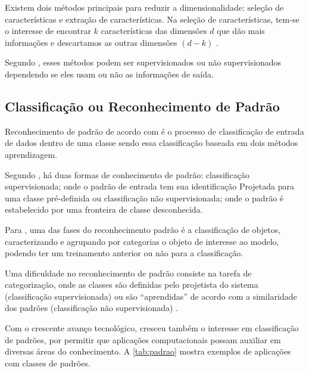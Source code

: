Existem dois métodos principais para reduzir a dimensionalidade: seleção de características e extração de características. Na seleção de características, tem-se o interesse de encontrar $k$ características das dimensões $d$ que dão mais informações e descartamos as outras dimensões $(d - k)$ \cite{alpaydin2014}.

Segundo , esses métodos podem ser supervisionados ou não supervisionados dependendo se eles usam ou não as informações de saída. 

\subsection{\textbf{Classificação ou Reconhecimento de Padrão}}

Reconhecimento de padrão de acordo com  é o processo de classificação de entrada de dados dentro de uma classe sendo essa classificação baseada em dois métodos aprendizagem.

Segundo \cite{bianchi2006}, há duas formas de conhecimento de padrão: classificação supervisionada; onde o padrão de entrada tem sua identificação Projetada para uma classe pré-definida ou classificação não supervisionada; onde o padrão é estabelecido por uma fronteira de classe desconhecida. 

Para , uma das fases do reconhecimento padrão é a classificação de objetos, caracterizando e agrupando por categorias o objeto de interesse ao modelo, podendo ter um treinamento anterior ou não para a classificação.

Uma dificuldade no reconhecimento de padrão consiste na tarefa de categorização, onde as classes são definidas pelo projetista do sistema (classificação supervisionada) ou são ``aprendidas'' de acordo com a similaridade dos padrões (classificação não supervisionada) \cite{bianchi2006}.

Com o crescente avanço tecnológico, cresceu também o interesse em classificação de padrões, por permitir que aplicações computacionais possam auxiliar em diversas áreas do conhecimento. A \autoref{tab:padrao} mostra exemplos de aplicações com classes de padrões.

